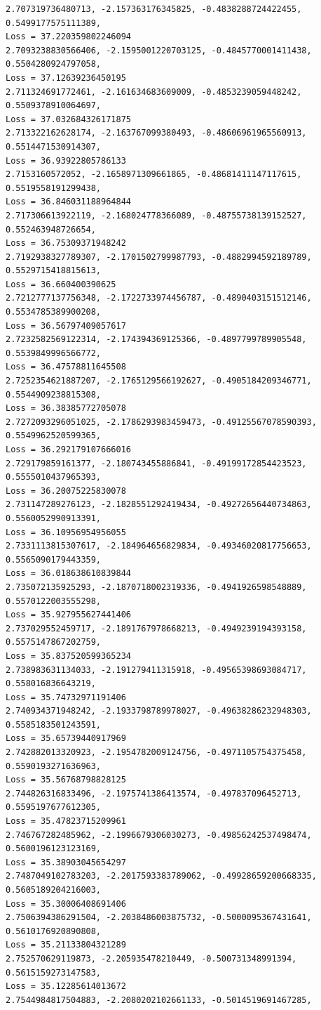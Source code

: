 \documentclass[11pt]{article}
\begin{document}
\begin{Verbatim}[commandchars=\\\{\}]
2.707319736480713, -2.157363176345825, -0.4838288724422455, 0.5499177575111389,
Loss = 37.220359802246094
2.7093238830566406, -2.1595001220703125, -0.4845770001411438,
0.5504280924797058,
Loss = 37.12639236450195
2.711324691772461, -2.161634683609009, -0.4853239059448242, 0.5509378910064697,
Loss = 37.032684326171875
2.713322162628174, -2.163767099380493, -0.48606961965560913, 0.5514471530914307,
Loss = 36.93922805786133
2.7153160572052, -2.1658971309661865, -0.48681411147117615, 0.5519558191299438,
Loss = 36.846031188964844
2.717306613922119, -2.168024778366089, -0.48755738139152527, 0.552463948726654,
Loss = 36.75309371948242
2.7192938327789307, -2.1701502799987793, -0.4882994592189789,
0.5529715418815613,
Loss = 36.660400390625
2.7212777137756348, -2.1722733974456787, -0.4890403151512146,
0.5534785389900208,
Loss = 36.56797409057617
2.7232582569122314, -2.174394369125366, -0.4897799789905548, 0.5539849996566772,
Loss = 36.47578811645508
2.7252354621887207, -2.1765129566192627, -0.4905184209346771,
0.5544909238815308,
Loss = 36.38385772705078
2.7272093296051025, -2.1786293983459473, -0.49125567078590393,
0.5549962520599365,
Loss = 36.292179107666016
2.729179859161377, -2.180743455886841, -0.49199172854423523, 0.5555010437965393,
Loss = 36.20075225830078
2.731147289276123, -2.1828551292419434, -0.49272656440734863,
0.5560052990913391,
Loss = 36.10956954956055
2.7331113815307617, -2.184964656829834, -0.49346020817756653,
0.5565090179443359,
Loss = 36.018638610839844
2.735072135925293, -2.1870718002319336, -0.4941926598548889, 0.5570122003555298,
Loss = 35.927955627441406
2.737029552459717, -2.1891767978668213, -0.4949239194393158, 0.5575147867202759,
Loss = 35.837520599365234
2.738983631134033, -2.191279411315918, -0.49565398693084717, 0.558016836643219,
Loss = 35.74732971191406
2.740934371948242, -2.1933798789978027, -0.49638286232948303,
0.5585183501243591,
Loss = 35.65739440917969
2.742882013320923, -2.1954782009124756, -0.4971105754375458, 0.5590193271636963,
Loss = 35.56768798828125
2.744826316833496, -2.1975741386413574, -0.497837096452713, 0.5595197677612305,
Loss = 35.47823715209961
2.746767282485962, -2.1996679306030273, -0.49856242537498474,
0.5600196123123169,
Loss = 35.38903045654297
2.7487049102783203, -2.2017593383789062, -0.49928659200668335,
0.5605189204216003,
Loss = 35.30006408691406
2.7506394386291504, -2.2038486003875732, -0.5000095367431641,
0.5610176920890808,
Loss = 35.21133804321289
2.752570629119873, -2.205935478210449, -0.500731348991394, 0.5615159273147583,
Loss = 35.12285614013672
2.7544984817504883, -2.2080202102661133, -0.5014519691467285,

\end{Verbatim}
\end{document}
